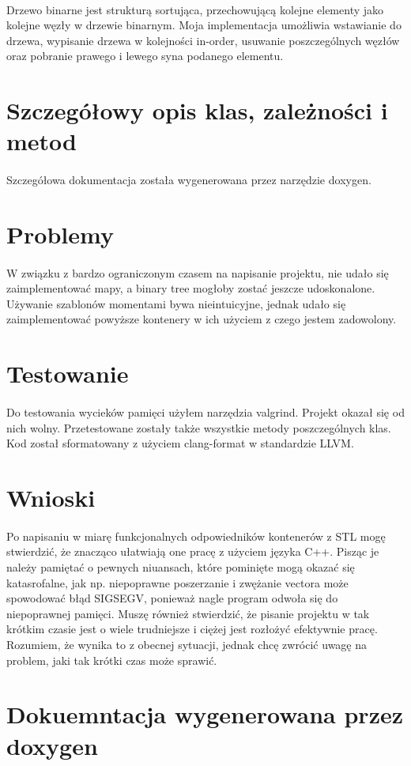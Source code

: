 \documentclass{article}
\begin{document}
\paragraph{}
Drzewo binarne jest strukturą sortująca, przechowującą kolejne elementy jako kolejne węzły w drzewie binarnym.
Moja implementacja umożliwia wstawianie do drzewa, wypisanie drzewa w kolejności in-order, usuwanie poszczególnych
węzłów oraz pobranie prawego i lewego syna podanego elementu.

\section{Szczegółowy opis klas, zależności i metod}

\paragraph{}
Szczegółowa dokumentacja została wygenerowana przez narzędzie doxygen.

\section{Problemy}
\paragraph{}
W związku z bardzo ograniczonym czasem na napisanie projektu, nie udało się zaimplementować mapy, a binary tree
mogłoby zostać jeszcze udoskonalone. Używanie szablonów momentami bywa nieintuicyjne, jednak udało się zaimplementować
powyższe kontenery w ich użyciem z czego jestem zadowolony.

\section{Testowanie}
\paragraph{}
Do testowania wycieków pamięci użyłem narzędzia valgrind. Projekt okazał się od nich wolny. Przetestowane zostały
także wszystkie metody poszczególnych klas. Kod został sformatowany z użyciem clang-format w standardzie LLVM.

\section{Wnioski}
\paragraph{}
Po napisaniu w miarę funkcjonalnych odpowiedników kontenerów z STL mogę stwierdzić, że znacząco ułatwiają one
pracę z użyciem języka C++. Pisząc je należy pamiętać o pewnych niuansach, które pominięte mogą okazać się
katasrofalne, jak np. niepoprawne poszerzanie i zwężanie vectora może spowodować błąd SIGSEGV, ponieważ
nagle program odwoła się do niepoprawnej pamięci. Muszę również stwierdzić, że pisanie projektu w tak krótkim czasie
jest o wiele trudniejsze i ciężej jest rozłożyć efektywnie pracę. Rozumiem, że wynika to z obecnej sytuacji, jednak chcę
zwrócić uwagę na problem, jaki tak krótki czas może sprawić.

\section{Dokuemntacja wygenerowana przez doxygen}
\end{document}
